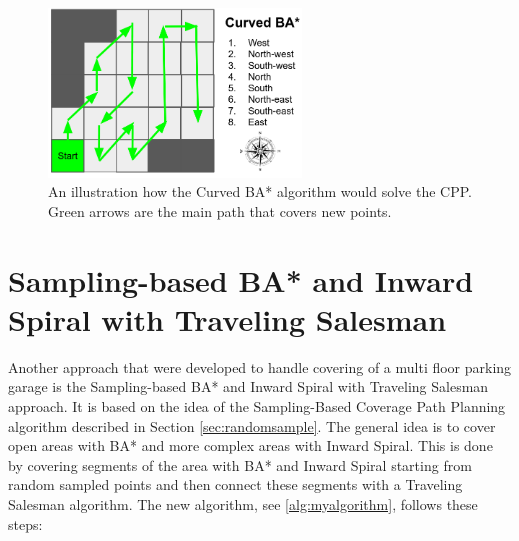 \begin{figure}
    \centering
    \includegraphics[width=0.6\textwidth]{figures/examplebastarvariant.png}
    \caption{An illustration how the Curved BA* algorithm would solve the CPP. Green arrows are the main path that covers new points.}
    \label{fig:examplebastarvariant}
\end{figure}

\section{Sampling-based BA* and Inward Spiral with Traveling Salesman}
Another approach that were developed to handle covering of a multi floor parking garage is the Sampling-based BA* and Inward Spiral with Traveling Salesman approach. It is based on the idea of the Sampling-Based Coverage Path Planning algorithm described in Section \ref{sec:randomsample}. The general idea is to cover open areas with BA* and more complex areas with Inward Spiral. This is done by covering segments of the area with BA* and Inward Spiral starting from random sampled points and then connect these segments with a Traveling Salesman algorithm. The new algorithm, see \ref{alg:myalgorithm}, follows these steps:

